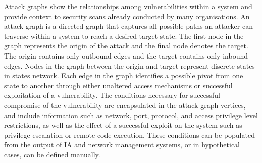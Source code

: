 Attack graphs show the relationships among vulnerabilities within a system and provide context to security scans already conducted by many organisations. An attack graph is a directed graph that captures all possible paths an attacker can traverse within a system to reach a desired target state. The first node in the graph represents the origin of the attack and the final node denotes the target. The origin contains only outbound edges and the target contains only inbound edges. Nodes in the graph between the origin and target represent discrete states in states network. Each edge in the graph identifies a possible pivot from one state to another through either unaltered access mechanisms or successful exploitation of a vulnerability. The conditions necessary for successful compromise of the vulnerability are encapsulated in the attack graph vertices, and include information such as network, port, protocol, and access privilege level restrictions, as well as the effect of a successful exploit on the system such as privilege escalation or remote code execution. These conditions can be populated from the output of IA and network management systems, or in hypothetical cases, can be defined manually.  





